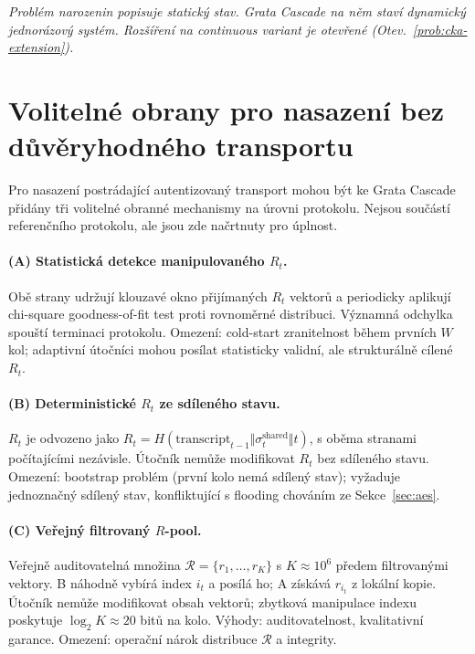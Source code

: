 \documentclass[11pt,a4paper]{article}
\begin{document}
\medskip
\noindent\textit{Problém narozenin popisuje statický stav. Grata Cascade na něm staví dynamický jednorázový systém. Rozšíření na continuous variant je otevřené (Otev.~\ref{prob:cka-extension}).}

\appendix

\section{Volitelné obrany pro nasazení bez důvěryhodného transportu}\label{app:optional-defenses}

Pro nasazení postrádající autentizovaný transport mohou být ke Grata Cascade přidány tři volitelné obranné mechanismy na úrovni protokolu. Nejsou součástí referenčního protokolu, ale jsou zde načrtnuty pro úplnost.

\paragraph{(A) Statistická detekce manipulovaného $R_t$.} Obě strany udržují klouzavé okno přijímaných $R_t$ vektorů a periodicky aplikují chi-square goodness-of-fit test proti rovnoměrné distribuci. Významná odchylka spouští terminaci protokolu. Omezení: cold-start zranitelnost během prvních $W$ kol; adaptivní útočníci mohou posílat statisticky validní, ale strukturálně cílené $R_t$.

\paragraph{(B) Deterministické $R_t$ ze sdíleného stavu.} $R_t$ je odvozeno jako $R_t = H(\text{transcript}_{t-1} \Vert \sigma_t^{\text{shared}} \Vert t)$, s oběma stranami počítajícími nezávisle. Útočník nemůže modifikovat $R_t$ bez sdíleného stavu. Omezení: bootstrap problém (první kolo nemá sdílený stav); vyžaduje jednoznačný sdílený stav, konfliktující s flooding chováním ze Sekce~\ref{sec:aes}.

\paragraph{(C) Veřejný filtrovaný $R$-pool.} Veřejně auditovatelná množina $\mathcal{R} = \{r_1, \ldots, r_K\}$ s $K \approx 10^6$ předem filtrovanými vektory. B náhodně vybírá index $i_t$ a posílá ho; A získává $r_{i_t}$ z lokální kopie. Útočník nemůže modifikovat obsah vektorů; zbytková manipulace indexu poskytuje $\log_2 K \approx 20$ bitů na kolo. Výhody: auditovatelnost, kvalitativní garance. Omezení: operační nárok distribuce $\mathcal{R}$ a integrity.
\end{document}
